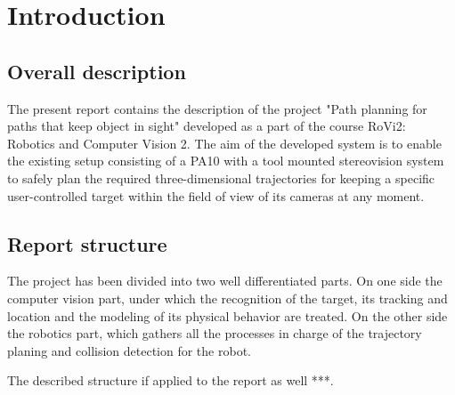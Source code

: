 
\chapter{Introduction}
\label{chap:introduction}

\section{Overall description}
The present report contains the description of the  project "Path planning for paths that keep
object in sight" developed as a part of the course RoVi2: Robotics and Computer Vision 2. 
The aim of the developed system is to enable the existing setup consisting of a PA10 with a tool mounted stereovision system to safely plan the required three-dimensional trajectories for keeping a specific user-controlled target within the field of view of its cameras at any moment. 

\section{Report structure}
The project has been divided into two well differentiated parts. On one side the computer vision part, under which the recognition of the target, its tracking and location and the modeling of its physical behavior are treated. On the other side the robotics part, which gathers all the processes in charge of the trajectory planing and collision detection for the robot.

The described structure if applied to the report as well ***.